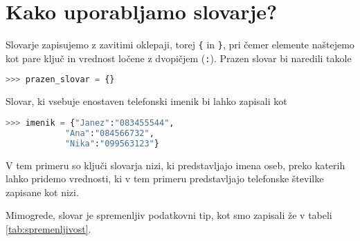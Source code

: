 \section{Kako uporabljamo slovarje?}

Slovarje zapisujemo z zavitimi oklepaji, torej \texttt{\{} in \texttt{\}}, pri čemer elemente naštejemo kot pare ključ in vrednost ločene z dvopičjem (\texttt{:}). Prazen slovar bi naredili takole
\begin{lstlisting}[language=Python]
>>> prazen_slovar = {}
\end{lstlisting}
Slovar, ki vsebuje enostaven telefonski imenik bi lahko zapisali kot
\begin{lstlisting}[language=Python]
>>> imenik = {"Janez":"083455544", 
            "Ana":"084566732", 
            "Nika":"099563123"}
\end{lstlisting}
V tem primeru so ključi slovarja nizi, ki predstavljajo imena oseb, preko katerih lahko pridemo vrednosti, ki v tem primeru predstavljajo telefonske številke zapisane kot nizi. 

Mimogrede, slovar je spremenljiv podatkovni tip, kot smo zapisali že v tabeli \ref{tab:spremenljivost}.


